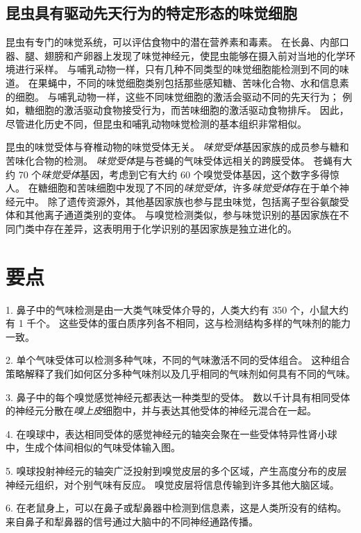 \subsection{昆虫具有驱动先天行为的特定形态的味觉细胞}

昆虫有专门的味觉系统，可以评估食物中的潜在营养素和毒素。
在长鼻、内部口器、腿、翅膀和产卵器上发现了味觉神经元，使昆虫能够在摄入前对当地的化学环境进行采样。
与哺乳动物一样，只有几种不同类型的味觉细胞能检测到不同的味道。
在果蝇中，不同的味觉细胞类别包括那些感知糖、苦味化合物、水和信息素的细胞。
与哺乳动物一样，这些不同味觉细胞的激活会驱动不同的先天行为；
例如，糖细胞的激活驱动食物接受行为，而苦味细胞的激活驱动食物排斥。
因此，尽管进化历史不同，但昆虫和哺乳动物味觉检测的基本组织非常相似。


昆虫的味觉受体与脊椎动物的味觉受体无关。
\textit{味觉受体}基因家族的成员参与糖和苦味化合物的检测。
\textit{味觉受体}是与苍蝇的气味受体远相关的跨膜受体。
苍蝇有大约 70 个\textit{味觉受体}基因，考虑到它有大约 60 个嗅觉受体基因，这个数字多得惊人。
在糖细胞和苦味细胞中发现了不同的\textit{味觉受体}，许多\textit{味觉受体}存在于单个神经元中。
除了遗传资源外，其他基因家族也参与昆虫味觉，包括离子型谷氨酸受体和其他离子通道类别的变体。
与嗅觉检测类似，参与味觉识别的基因家族在不同门类中存在差异，这表明用于化学识别的基因家族是独立进化的。



\section{要点}

1. 鼻子中的气味检测是由一大类气味受体介导的，人类大约有 350 个，小鼠大约有 1 千个。
这些受体的蛋白质序列各不相同，这与检测结构多样的气味剂的能力一致。


2. 单个气味受体可以检测多种气味，不同的气味激活不同的受体组合。
这种组合策略解释了我们如何区分多种气味剂以及几乎相同的气味剂如何具有不同的气味。


3. 鼻子中的每个嗅觉感觉神经元都表达一种类型的受体。
数以千计具有相同受体的神经元分散在\textit{嗅上皮}细胞中，并与表达其他受体的神经元混合在一起。


4. 在嗅球中，表达相同受体的感觉神经元的轴突会聚在一些受体特异性肾小球中，生成个体间相似的气味受体输入图。


5. 嗅球投射神经元的轴突广泛投射到嗅觉皮层的多个区域，产生高度分布的皮层神经元组织，对个别气味有反应。
嗅觉皮层将信息传输到许多其他大脑区域。


6. 在老鼠身上，可以在鼻子或犁鼻器中检测到信息素，这是人类所没有的结构。
来自鼻子和犁鼻器的信号通过大脑中的不同神经通路传播。


